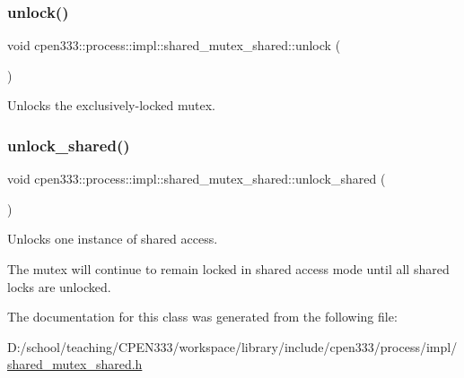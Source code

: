 \subsubsection{\texorpdfstring{unlock()}{unlock()}}
{\footnotesize\ttfamily void cpen333\+::process\+::impl\+::shared\+\_\+mutex\+\_\+shared\+::unlock (\begin{DoxyParamCaption}{ }\end{DoxyParamCaption})\hspace{0.3cm}{\ttfamily [inline]}}



Unlocks the exclusively-\/locked mutex. 

\mbox{\label{classcpen333_1_1process_1_1impl_1_1shared__mutex__shared_a4a7331e891ef08ffddda51ab5722fac6}} 
\subsubsection{\texorpdfstring{unlock\+\_\+shared()}{unlock\_shared()}}
{\footnotesize\ttfamily void cpen333\+::process\+::impl\+::shared\+\_\+mutex\+\_\+shared\+::unlock\+\_\+shared (\begin{DoxyParamCaption}{ }\end{DoxyParamCaption})\hspace{0.3cm}{\ttfamily [inline]}}



Unlocks one instance of shared access. 

The mutex will continue to remain locked in shared access mode until all shared locks are unlocked. 

The documentation for this class was generated from the following file\+:\begin{DoxyCompactItemize}
\item 
D\+:/school/teaching/\+C\+P\+E\+N333/workspace/library/include/cpen333/process/impl/\hyperlink{process_2impl_2shared__mutex__shared_8h}{shared\+\_\+mutex\+\_\+shared.\+h}\end{DoxyCompactItemize}
